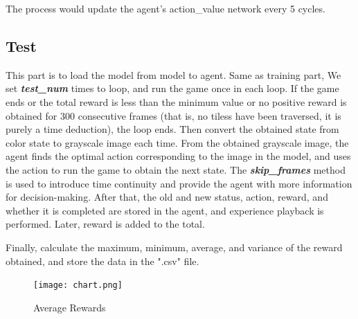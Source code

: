 \documentclass{article}
\begin{document}
The process would update the agent's action\_value network every 5 cycles.

\subsection{Test}
This part is to load the model from model to agent. Same as training part, 
We set \textbf{\textit{test\_num}} times to loop, and run the game once in each loop. 
If the game ends or the total reward is less than the minimum value or no positive 
reward is obtained for 300 consecutive frames (that is, no tiless have been traversed, it is 
purely a time deduction), the loop ends. Then convert the obtained state from 
color state to grayscale image each time. From the obtained grayscale image, 
the agent finds the optimal action corresponding to the image in the model, and uses 
the action to run the game to obtain the next state. The \textbf{\textit{skip\_frames}} method is used 
to introduce time continuity and provide the agent with more information for decision-making. 
After that, the old and new status, action, reward, and whether it is completed are stored 
in the agent, and experience playback is performed. Later, reward is added to the total. 

Finally, calculate the maximum, minimum, average, and variance of the reward obtained, and 
store the data in the ".csv" file.

\begin{figure}[h!]
  \centering
  \texttt{[image: chart.png]}
  \caption{Average Rewards}
  \label{figure}
\end{figure}









\end{document}
